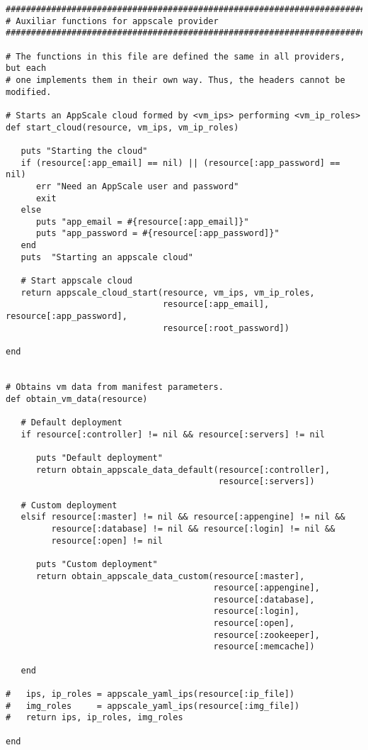 \begin{lstlisting}
################################################################################
# Auxiliar functions for appscale provider
################################################################################

# The functions in this file are defined the same in all providers, but each
# one implements them in their own way. Thus, the headers cannot be modified.

# Starts an AppScale cloud formed by <vm_ips> performing <vm_ip_roles>
def start_cloud(resource, vm_ips, vm_ip_roles)

   puts "Starting the cloud"
   if (resource[:app_email] == nil) || (resource[:app_password] == nil)
      err "Need an AppScale user and password"
      exit
   else
      puts "app_email = #{resource[:app_email]}"
      puts "app_password = #{resource[:app_password]}"
   end
   puts  "Starting an appscale cloud"
   
   # Start appscale cloud
   return appscale_cloud_start(resource, vm_ips, vm_ip_roles,
                               resource[:app_email], resource[:app_password],
                               resource[:root_password])

end


# Obtains vm data from manifest parameters.
def obtain_vm_data(resource)

   # Default deployment
   if resource[:controller] != nil && resource[:servers] != nil

      puts "Default deployment"
      return obtain_appscale_data_default(resource[:controller],
                                          resource[:servers])

   # Custom deployment
   elsif resource[:master] != nil && resource[:appengine] != nil &&
         resource[:database] != nil && resource[:login] != nil &&
         resource[:open] != nil

      puts "Custom deployment"
      return obtain_appscale_data_custom(resource[:master],
                                         resource[:appengine],
                                         resource[:database],
                                         resource[:login],
                                         resource[:open],
                                         resource[:zookeeper],
                                         resource[:memcache])

   end

#   ips, ip_roles = appscale_yaml_ips(resource[:ip_file])
#   img_roles     = appscale_yaml_ips(resource[:img_file])
#   return ips, ip_roles, img_roles
   
end
\end{lstlisting}


